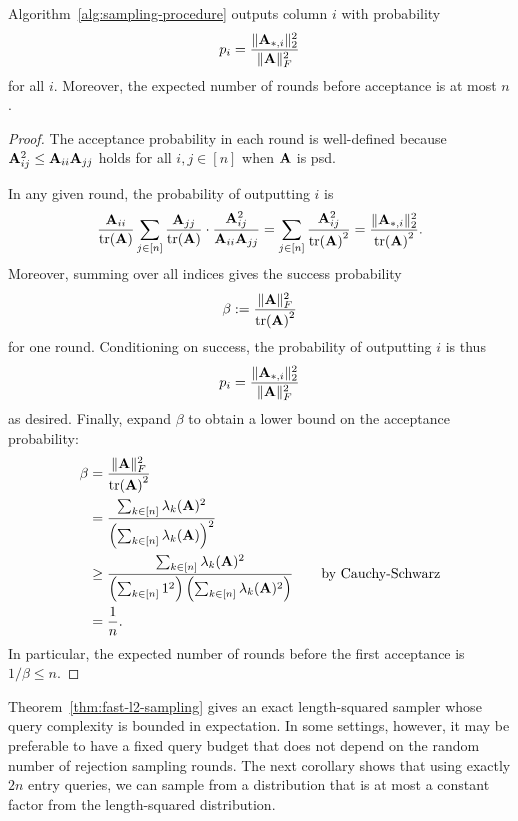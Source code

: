 \begin{theorem}
    \label{thm:fast-l2-sampling}
    Algorithm~\ref{alg:sampling-procedure} outputs column $i$ with probability
    \[p_i = \frac{\|\mathbf{A}_{*, i}\|^2_2}{\|\mathbf{A}\|^2_F}\]
    for all $i$. Moreover, the expected number of rounds before acceptance is at most $n$.
\end{theorem}

\begin{proof}
    The acceptance probability in each round is well-defined because $\mathbf{A}_{ij}^2\leq\mathbf{A}_{ii}\mathbf{A}_{jj}$ holds for all $i,j\in [n]$ when $\mathbf{A}$ is psd.
    
    In any given round, the probability of outputting $i$ is
    \[\frac{\mathbf{A}_{ii}}{\tr(\mathbf{A})}\sum_{j\in [n]} \frac{\mathbf{A}_{jj}}{\tr(\mathbf{A})}\cdot \frac{\mathbf{A}_{ij}^2}{\mathbf{A}_{ii}\mathbf{A}_{jj}} = \sum_{j\in [n]}\frac{\mathbf{A}_{ij}^2}{\tr(\mathbf{A})^2} = \frac{\|\mathbf{A}_{*, i}\|^2_2}{\tr(\mathbf{A})^2}.\]
    Moreover, summing over all indices gives the success probability
    \[\beta := \frac{\|\mathbf{A}\|^2_F}{\tr(\mathbf{A})^2}\]
    for one round. Conditioning on success, the probability of outputting $i$ is thus
    \[p_i = \frac{\|\mathbf{A}_{*, i}\|^2_2}{\|\mathbf{A}\|^2_F}\]
    as desired. Finally, expand $\beta$ to obtain a lower bound on the acceptance probability:
    \begin{align*}
        \beta &= \frac{\|\mathbf{A}\|^2_F}{\tr(\mathbf{A})^2}\\
        &= \frac{\sum_{k \in [n]}\lambda_k(\mathbf{A})^2}{\left(\sum_{k \in [n]}\lambda_k(\mathbf{A})\right)^2}\\
        &\geq \frac{\sum_{k \in [n]}\lambda_k(\mathbf{A})^2}{\left(\sum_{k \in [n]}1^2\right)\left(\sum_{k \in [n]}\lambda_k(\mathbf{A})^2\right)}\qquad\text{by Cauchy-Schwarz}\\
        &= \frac{1}{n}.
    \end{align*}
    In particular, the expected number of rounds before the first acceptance is $1/\beta\leq n$.
\end{proof}

Theorem~\ref{thm:fast-l2-sampling} gives an exact length-squared sampler whose query complexity is bounded in expectation. In some settings, however, it may be preferable to have a fixed query budget that does not depend on the random number of rejection sampling rounds. The next corollary shows that using exactly $2n$ entry queries, we can sample from a distribution that is at most a constant factor from the length-squared distribution.

